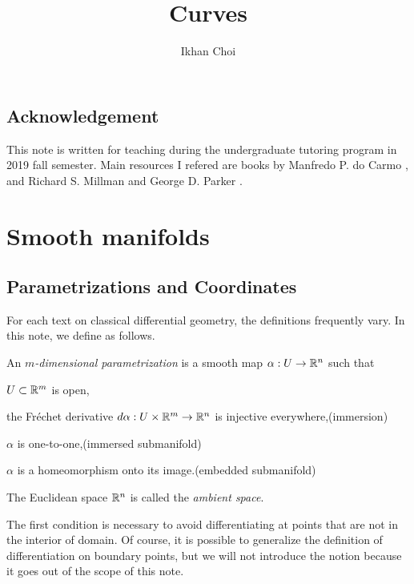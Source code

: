 \documentclass{../../large}
\def\a{\alpha}
\begin{document}
\title{Curves}
\author{Ikhan Choi}
\maketitle
\tableofcontents


\section*{Acknowledgement}
This note is written for teaching during the undergraduate tutoring program in 2019 fall semester.
Main resources I refered are books by Manfredo P. do Carmo \cite{}, and Richard S. Millman and George D. Parker \cite{}.











\chapter{Smooth manifolds}
\section{Parametrizations and Coordinates}

For each text on classical differential geometry, the definitions frequently vary.
In this note, we define as follows.
\begin{defn}
An \emph{$m$-dimensional parametrization} is a smooth map $\a:U\to\R^n$ such that
\begin{parts}
\item $U\subset\mathbb{R}^m$ is open,
\item the Fr\'echet derivative $d\a:U\times\R^m\to\R^n$ is injective everywhere,\hfill(immersion)
\item $\a$ is one-to-one,\hfill(immersed submanifold)
\item $\a$ is a homeomorphism onto its image.\hfill(embedded submanifold)
\end{parts}
The Euclidean space $\mathbb{R}^n$ is called the \emph{ambient space}.
\end{defn}

The first condition is necessary to avoid differentiating at points that are not in the interior of domain.
Of course, it is possible to generalize the definition of differentiation on boundary points, but we will not introduce the notion because it goes out of the scope of this note.
\end{document}

